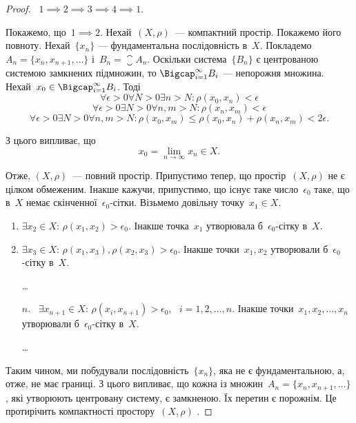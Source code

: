 \begin{proof}~$1 \implies 2 \implies 3 \implies 4 \implies 1$.

Покажемо, що~$1 \implies 2$. Нехай~$(X, \rho)$~--- компактний
простір. Покажемо його повноту. Нехай~$\{x_n\}$ ---
фундаментальна послідовність в~$X$. Покладемо
$A_n = \{x_n, x_{n + 1}, \dots\}$ і~$B_n = \closure A_n$. Оскільки система~$\{B_n\}$ є
центрованою системою замкнених підмножин, то
$\Bigcap_{i = 1}^\infty B_i$ ---
непорожня множина. Нехай~$x_0 \in \Bigcap_{i = 1}^\infty B_i$. Тоді
\begin{equation*}
    \forall \epsilon > 0 \forall N > 0 \exists n > N: \rho(x_0, x_n) < \epsilon
\end{equation*}
\begin{equation*}
    \forall \epsilon > 0 \exists N > 0 \forall n, m > N: \rho(x_n, x_m) < \epsilon
\end{equation*}
\begin{equation*}
    \forall \epsilon > 0 \exists N > 0 \forall n, m > N:
    \rho(x_0, x_m) \le \rho(x_0, x_n) + \rho(x_n, x_m) < 2 \epsilon.
\end{equation*}

З цього випливає, що
\begin{equation*}
    x_0 = \lim_{n \to \infty} x_n \in X.
\end{equation*}

Отже, $(X, \rho)$~--- повний простір.
Припустимо тепер, що простір~$(X, \rho)$ не є цілком
обмеженим. Інакше кажучи, припустимо, що існує таке
число~$\epsilon_0$ таке, що в~$X$ немає скінченної~$\epsilon_0$-сітки.
Візьмемо довільну точку~$x_1 \in X$.
\begin{enumerate}
    \item $\exists x_2 \in  X$: $\rho(x_1, x_2) > \epsilon_0$.
    Інакше точка~$x_1$ утворювала б~$\epsilon_0$-сітку в~$X$.

    \item $\exists x_3 \in  X$: $\rho(x_1, x_3), \rho(x_2, x_3) > \epsilon_0$.
    Інакше точки~$x_1, x_2$ утворювали б~$\epsilon_0$-сітку в~$X$.

    \dots

    \item[$n$.]~$\exists x_{n + 1} \in  X$: $\rho(x_i, x_{n + 1}) > \epsilon_0$,
   ~$i = 1, 2, \dots, n$.
    Інакше точки~$x_1, x_2, \dots, x_n$ утворювали б~$\epsilon_0$-сітку в~$X$.
    
    \dots
\end{enumerate}

Таким чином, ми побудували послідовність~$\{x_n\}$, яка не є
фундаментальною, а, отже, не має границі. З цього
випливає, що кожна із множин~$A_n = \{x_n, x_{n +1}, \dots\}$, які
утворюють центровану систему, є замкненою. Їх перетин є
порожнім. Це протирічить компактності простору~$(X, \rho)$ .


\end{proof}
